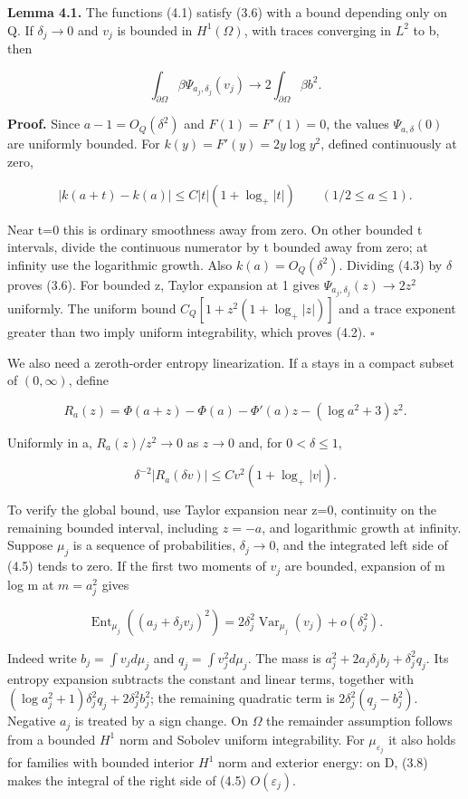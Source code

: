 \documentclass[11pt]{article}
\begin{document}
\textbf{Lemma 4.1.} The functions (4.1) satisfy (3.6) with a bound
depending only on Q. If \(\delta _j\to 0\) and \(v_j\) is bounded in
\(H^{1}(\Omega )\), with traces converging in \(L^{2}\) to b, then

\[\int_{\partial\Omega}\beta\Psi_{a_j,\delta_j}(v_j)
\longrightarrow2\int_{\partial\Omega}\beta b^2.\tag{4.2}\]

\textbf{Proof.} Since \(a-1=O_Q(\delta ^{2})\) and \(F(1)=F'(1)=0\), the
values \(\Psi _{a,\delta }(0)\) are uniformly bounded. For
\(k(y)=F'(y)=2y\log y^2\), defined continuously at zero,

\[|k(a+t)-k(a)|\leq C|t|(1+\log_+|t|)\qquad(1/2\leq a\leq1).\tag{4.3}\]

Near t=0 this is ordinary smoothness away from zero. On other bounded t
intervals, divide the continuous numerator by \textbar t\textbar{}
bounded away from zero; at infinity use the logarithmic growth. Also
\(k(a)=O_Q(\delta ^{2})\). Dividing (4.3) by \(\delta\) proves (3.6).
For bounded z, Taylor expansion at 1 gives
\(\Psi _{a_j,\delta _j}(z)\to 2z^{2}\) uniformly. The uniform bound
\(C_Q[1+z^{2}(1+\log _+|z|)]\) and a trace exponent greater than two
imply uniform integrability, which proves (4.2). \(\square\)

We also need a zeroth-order entropy linearization. If a stays in a
compact subset of \((0,\infty )\), define

\[R_a(z)=\Phi(a+z)-\Phi(a)-\Phi'(a)z-(\log a^2+3)z^2.\tag{4.4}\]

Uniformly in a, \(R_a(z)/z^{2}\to 0\) as \(z\to 0\) and, for
\(0<\delta \leq 1\),

\[\delta^{-2}|R_a(\delta v)|\leq Cv^2(1+\log_+|v|).\tag{4.5}\]

To verify the global bound, use Taylor expansion near z=0, continuity on
the remaining bounded interval, including \(z=-a\), and logarithmic
growth at infinity. Suppose \(\mu _j\) is a sequence of probabilities,
\(\delta _j\to 0\), and the integrated left side of (4.5) tends to zero.
If the first two moments of \(v_j\) are bounded, expansion of m log m at
\(m=a_j^{2}\) gives

\[\operatorname{Ent}_{\mu_j}((a_j+\delta_jv_j)^2)
=2\delta_j^2\operatorname{Var}_{\mu_j}(v_j)+o(\delta_j^2).\tag{4.6}\]

Indeed write \(b_j=\int v_jd\mu _j\) and \(q_j=\int v_j^{2}d\mu _j\).
The mass is \(a_j^{2}+2a_j\delta _jb_j+\delta _j^{2}q_j\). Its entropy
expansion subtracts the constant and linear terms, together with
\((\log a_j^2+1)\delta_j^2q_j+2\delta_j^2b_j^2\); the remaining
quadratic term is \(2\delta _j^{2}(q_j-b_j^{2})\). Negative \(a_j\) is
treated by a sign change. On \(\Omega\) the remainder assumption follows
from a bounded \(H^{1}\) norm and Sobolev uniform integrability. For
\(\mu _{\varepsilon _j}\) it also holds for families with bounded
interior \(H^{1}\) norm and exterior energy: on D, (3.8) makes the
integral of the right side of (4.5) \(O(\varepsilon _j)\).
\end{document}
